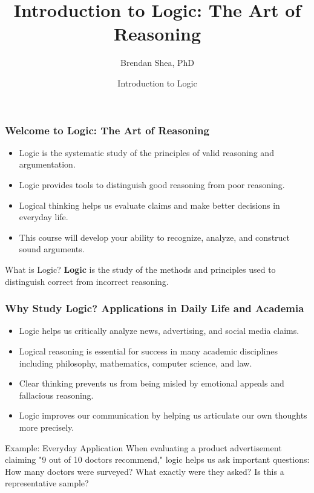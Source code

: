 \documentclass{beamer}
\title{Introduction to Logic: The Art of Reasoning}
\author{Brendan Shea, PhD}
\date{Introduction to Logic}
\begin{document}
\begin{frame}
    \titlepage
\end{frame}

\begin{frame}
    \frametitle{Welcome to Logic: The Art of Reasoning}
    \begin{itemize}
        \item Logic is the systematic study of the principles of valid reasoning and argumentation.
        \item Logic provides tools to distinguish good reasoning from poor reasoning.
        \item Logical thinking helps us evaluate claims and make better decisions in everyday life.
        \item This course will develop your ability to recognize, analyze, and construct sound arguments.
    \end{itemize}
    
    \begin{alertblock}{What is Logic?}
        \textbf{Logic} is the study of the methods and principles used to distinguish correct from incorrect reasoning.
    \end{alertblock}
\end{frame}

\begin{frame}
    \frametitle{Why Study Logic? Applications in Daily Life and Academia}
    \begin{itemize}
        \item Logic helps us critically analyze news, advertising, and social media claims.
        \item Logical reasoning is essential for success in many academic disciplines including philosophy, mathematics, computer science, and law.
        \item Clear thinking prevents us from being misled by emotional appeals and fallacious reasoning.
        \item Logic improves our communication by helping us articulate our own thoughts more precisely.
    \end{itemize}
    
    \begin{exampleblock}{Example: Everyday Application}
        When evaluating a product advertisement claiming "9 out of 10 doctors recommend," logic helps us ask important questions: How many doctors were surveyed? What exactly were they asked? Is this a representative sample?
    \end{exampleblock}
\end{frame}
\end{document}
